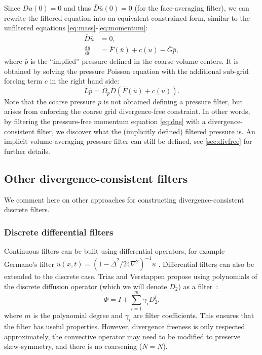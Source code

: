\documentclass[preprint]{elsarticle}
\newcommand{\revboth}[1]{#1}
\begin{document}
Since $D u(0) = 0$ and thus $\bar{D} \bar{u}(0) = 0$ (for the face-averaging
filter), we can  rewrite the filtered equation into an equivalent constrained
form, similar to the unfiltered equations \eqref{eq:mass}-\eqref{eq:momentum}:
\begin{align}
    \bar{D} \bar{u} & = 0, \\
    \frac{\mathrm{d} \bar{u}}{\mathrm{d} t}
        & = \bar{F}(\bar{u}) + c(u) - \bar{G} \bar{p},
\end{align}
where $\bar{p}$ is the ``implied'' pressure defined in the coarse volume centers.
It is obtained by solving the pressure Poisson equation with the additional
sub-grid forcing term $c$ in the right hand side:
\begin{equation}
    \bar{L} \bar{p} = \bar{\Omega}_p \bar{D} \left( \bar{F}(\bar{u}) + c(u) \right).
\end{equation}
Note that the coarse pressure $\bar{p}$ is not obtained defining a pressure
filter, but arises from enforcing the coarse grid divergence-free constraint. In
other words, by filtering the pressure-free momentum equation \eqref{eq:dns}
with a divergence-consistent filter, we discover what the (implicitly defined)
filtered pressure is. \revboth{An implicit volume-averaging pressure filter can
still be defined, see \ref{sec:divfree} for further details.}

\subsection{Other divergence-consistent filters}

We comment here on other approaches for constructing divergence-consistent
discrete filters.

\subsubsection{Discrete differential filters}

Continuous filters can be built using differential operators, for example
Germano's filter $\bar{u}(x, t) = (1 - \bar{\Delta}^2 / 24 \nabla^2)^{-1} u$
\cite{Germano1986,Vidal2016}. Differential filters can also be extended to the
discrete case. Trias and Verstappen propose using polynomials of the discrete
diffusion operator (which we will denote $D_2$) as a filter~\cite{Trias2011}:
\begin{equation}
    \Phi = I + \sum_{i = 1}^m \gamma_i D_2^i.
\end{equation}
where $m$ is the polynomial degree and $\gamma_i$ are filter coefficients. This
ensures that the filter has useful properties. However, divergence freeness is
only respected approximately, the convective operator may need to be modified to
preserve skew-symmetry, and there is no coarsening ($\bar{N} = N$).
\end{document}

